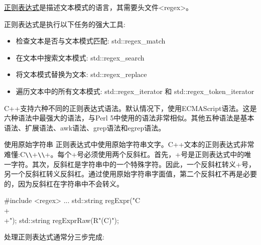 
\href{http://en.cppreference.com/w/cpp/regex}{正则表达式}是描述文本模式的语言，其需要头文件<regex>。

正则表达式是执行以下任务的强大工具:

\begin{itemize}
\item 
检查文本是否与文本模式匹配: std::regex\_match

\item 
在文本中搜索文本模式: std::regex\_search

\item 
将文本模式替换为文本: std::regex\_replace

\item 
遍历文本中的所有文本模式: std::regex\_iterator 和 std::regex\_token\_iterator
\end{itemize}

C++支持六种不同的正则表达式语法。默认情况下，使用ECMAScript语法。这是六种语法中最强大的语法，与Perl 5中使用的语法非常相似。其他五种语法是基本语法、扩展语法、awk语法、grep语法和egrep语法。

\begin{myTip}{使用原始字符串}
正则表达式中使用原始字符串文字。C++文本的正则表达式非常难懂:C\verb|\\|+\verb|\\|+。每个+号必须使用两个反斜杠。首先，+号是正则表达式中的唯一字符。其次，反斜杠是字符串中的一个特殊字符。因此，一个反斜杠转义+号，另一个反斜杠转义反斜杠。通过使用原始字符串字面值，第二个反斜杠不再是必要的，因为反斜杠在字符串中不会转义。

\begin{cpp}
#include <regex>
...
std::string regExpr("C\\+\\+");
std::string regExprRaw(R"(C\+\+)");
\end{cpp}

\end{myTip}

处理正则表达式通常分三步完成:

